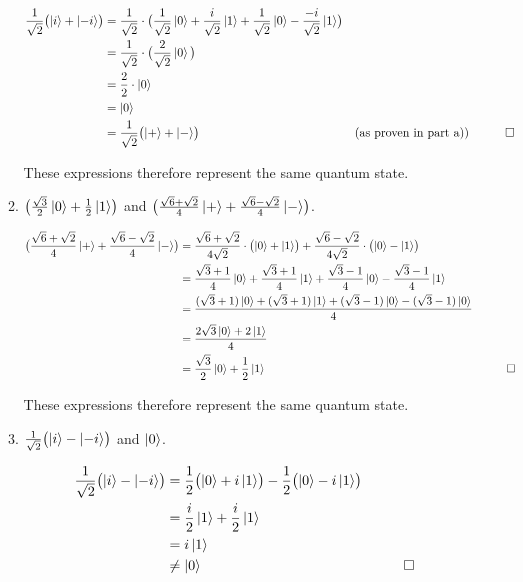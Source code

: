 \documentclass{article}
\begin{document}
\begin{enumerate}
\begin{enumerate}
\begin{align*}
    \frac{1}{\sqrt{2}} \bigl(\ket{i} + \ket{-i}\bigr)  &= \frac{1}{\sqrt{2}} \cdot \bigl(\frac{1}{\sqrt{2}}\ket{0} + \frac{i}{\sqrt{2}}\ket{1} + \frac{1}{\sqrt{2}}\ket{0} - \frac{-i}{\sqrt{2}}\ket{1}\bigr) \\
    &= \frac{1}{\sqrt{2}} \cdot \bigl(\frac{2}{\sqrt{2}} \ket{0} \bigl) \\
    &= \frac{2}{2} \cdot \ket{0} \\
    &= \ket{0} \\
    &=  \frac{1}{\sqrt{2}} \bigl(\ket{+} + \ket{-}\bigr) &&\text{(as proven in part a))}&&\qedhere
\end{align*}

These expressions therefore represent the same quantum state.
\clearpage

		\item $ \bigl(\frac{\sqrt{3}}{2} \ket0 + \frac{1}{2} \ket1\bigr) $ and $ \bigl( \frac{\sqrt{6} + \sqrt{2}}{4} \ket{+} + \frac{\sqrt{6} - \sqrt{2}}{4} \ket{-}\bigr)$.

\begin{align*}
    \bigl(\frac{\sqrt{6} + \sqrt{2}}{4} \ket{+} + \frac{\sqrt{6} - \sqrt{2}}{4} \ket{-}\bigr)  &= 
	 \frac{\sqrt{6} + \sqrt{2}}{4\sqrt{2}} \cdot \bigl(\ket{0} + \ket{1}\bigr) +  \frac{\sqrt{6} - \sqrt{2}}{4\sqrt{2}} \cdot \bigl(\ket{0} - \ket{1}\bigr) \\
    &= \frac{\sqrt{3} + 1}{4} \ket{0} + \frac{\sqrt{3} + 1}{4} \ket{1} + \frac{\sqrt{3} - 1}{4} \ket{0} - \frac{\sqrt{3} - 1}{4} \ket{1} \\
    &= \frac{(\sqrt{3} + 1)\ket{0} + (\sqrt{3} + 1)\ket{1} + (\sqrt{3} - 1)\ket{0} - (\sqrt{3} - 1)\ket{0}}{4} \\
    &= \frac{2 \sqrt{3} \ket{0} + 2 \ket{1}}{4} \\
    &= \frac{\sqrt{3}}{2}\ket{0} + \frac{1}{2}\ket{1}  &&\qedhere
\end{align*}

These expressions therefore represent the same quantum state.
\newline

		\item $\frac{1}{\sqrt{2}} \bigl(\ket{i} - \ket{-i}\bigr)$ and $\ket0$.
	
\begin{align*}
   \frac{1}{\sqrt{2}} \bigl(\ket{i} - \ket{-i}\bigr)  &= \frac{1}{2} \bigl(\ket{0} + i\ket{1}\bigr) - \frac{1}{2} \bigl(\ket{0} - i\ket{1}\bigr) \\
    &= \frac{i}{2} \ket{1} + \frac{i}{2} \ket{1}  \\
    &= i \ket{1} \\
    &\neq \ket{0} &&\qedhere
\end{align*}


\end{enumerate}
\end{enumerate}
\end{document}
